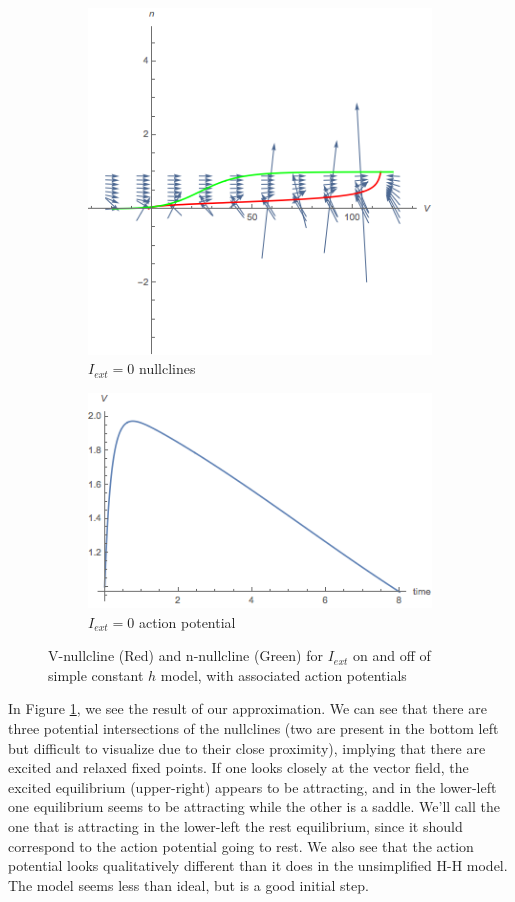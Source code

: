 \documentclass{article}
\begin{document}
\begin{figure}
\centering
\begin{subfigure}{\textwidth}
	\centering
	\includegraphics[width=10cm]{fastFast_nullc.png}
	\caption{$I_{ext}=0$ nullclines}
\end{subfigure}
\begin{subfigure}{\textwidth}
	\centering
	\includegraphics[width=10cm]{fastFast.png}
	\caption{$I_{ext}=0$ action potential}
\end{subfigure}
	\caption{V-nullcline (Red) and n-nullcline (Green) for $I_{ext}$ on and off of simple constant $h$ model, with associated action potentials}
	\label{fig:first}
\end{figure}

In Figure \ref{fig:first}, we see the result of our approximation. We can see that there are three potential intersections of the nullclines (two are present in the bottom left but difficult to visualize due to their close proximity), implying that there are excited and relaxed fixed points. If one looks closely at the vector field, the excited equilibrium (upper-right) appears to be attracting, and in the lower-left one equilibrium seems to be attracting while the other is a saddle. We'll call the one that is attracting in the lower-left the rest equilibrium, since it should correspond to the action potential going to rest. We also see that the action potential looks qualitatively different than it does in the unsimplified H-H model. The model seems less than ideal, but is a good initial step. 
\end{document}
